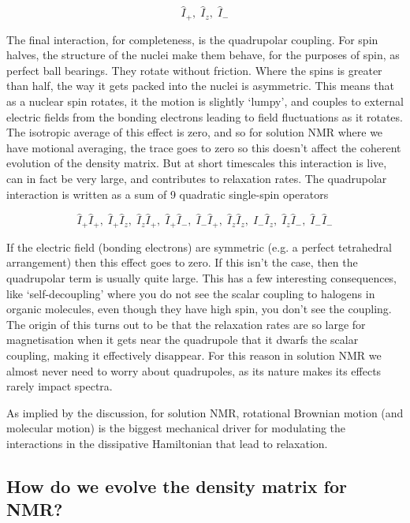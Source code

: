 \documentclass[notitlepage,11pt]{article}
\begin{document}
\begin{equation}
\hat{I}_+,\;\hat{I}_z,\;\hat{I}_-
\end{equation}

The final interaction, for completeness, is the quadrupolar coupling. For spin halves, the structure of the nuclei make them behave, for the purposes of spin, as perfect ball bearings. They rotate without friction. Where the spins is greater than half, the way it gets packed into the nuclei is asymmetric. This means that as a nuclear spin rotates, it the motion is slightly `lumpy', and couples to external electric fields from the bonding electrons leading to field fluctuations as it rotates. The isotropic average of this effect is zero, and so for solution NMR where we have motional averaging, the trace goes to zero so this doesn't affect the coherent evolution of the density matrix. But at short timescales this interaction is live, can in fact be very large, and contributes to relaxation rates. The quadrupolar interaction is written as a sum of 9 quadratic single-spin operators

\begin{equation}
\hat{I}_+\hat{I}_+,\;\hat{I}_+\hat{I}_z,\;\hat{I}_z\hat{I}_+,\;\hat{I}_+\hat{I}_-,\;\hat{I}_-\hat{I}_+,\;\hat{I}_z\hat{I}_z,\;\hat{I}_-\hat{I}_z,\;\hat{I}_z\hat{I}_-,\;\hat{I}_-\hat{I}_-
\end{equation}

If the electric field (bonding electrons) are symmetric (e.g. a perfect tetrahedral arrangement) then this effect goes to zero. If this isn't the case, then the quadrupolar term is usually quite large. This has a few interesting consequences, like `self-decoupling' where you do not see the scalar coupling to halogens in organic molecules, even though they have high spin, you don't see the coupling. The origin of this turns out to be that the relaxation rates are so large for magnetisation when it gets near the quadrupole that it dwarfs the scalar coupling, making it effectively disappear. For this reason in solution NMR we almost never need to worry about quadrupoles, as its nature makes its effects rarely impact spectra.

As implied by the discussion, for solution NMR, rotational Brownian motion (and molecular motion) is the biggest mechanical driver for modulating the interactions in the dissipative Hamiltonian that lead to relaxation. 


\subsection{How do we evolve the density matrix for NMR?}
\end{document}
